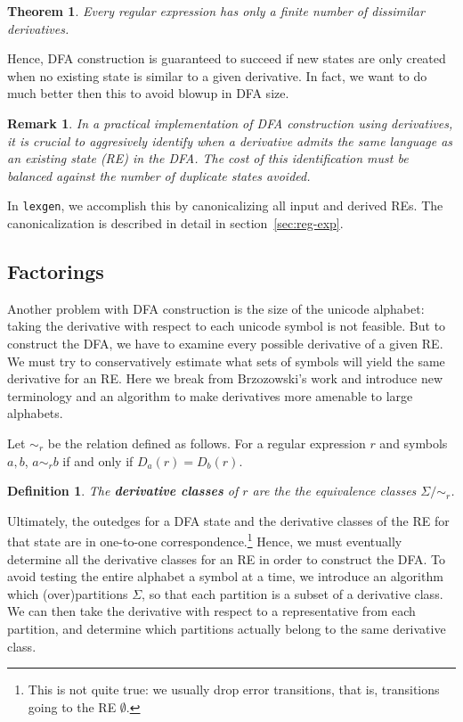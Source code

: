 \documentclass[11pt]{article}
\newcommand{\flex}{\texttt{lexgen}}
\newcommand{\RE}{r}
\newcommand{\New}[1]{\emph{\textbf{#1}}}
\newtheorem*{theorem}{Theorem}
\newtheorem*{definition}{Definition}
\newtheorem*{remark}{Remark}
\begin{document}
\begin{theorem} Every regular expression has only a finite number of dissimilar derivatives.
\end{theorem}

Hence, DFA construction is guaranteed to succeed if new states are only created when no existing state is similar to a given derivative.  In fact, we want to do much better then this to avoid blowup in DFA size.

\begin{remark}
In a practical implementation of DFA construction using derivatives, it is crucial to aggresively identify when a derivative admits the same language as an existing state (RE) in the DFA.  The cost of this identification must be balanced against the number of duplicate states avoided.
\end{remark}

In \flex{}, we accomplish this by canonicalizing all input and derived REs.  The canonicalization is described in detail in section~\ref{sec:reg-exp}.

\subsection{Factorings}\label{sec:factorings}

Another problem with DFA construction is the size of the unicode alphabet: taking the derivative with respect to each unicode symbol is not feasible.  But to construct the DFA, we have to examine every possible derivative of a given RE.  We must try to conservatively estimate what sets of symbols will yield the same derivative for an RE.  Here we break from Brzozowski's work and introduce new terminology and an algorithm to make derivatives more amenable to large alphabets.

Let $\sim_\RE$ be the relation defined as follows.  For a regular expression $\RE$ and symbols $a, b$, $a \sim_\RE b$ if and only if $D_a (\RE) = D_b (\RE)$.

\begin{definition}
The \New{derivative classes} of $\RE$ are the the equivalence classes $\Sigma/{\sim_\RE}$.
\end{definition}

Ultimately, the outedges for a DFA state and the derivative classes of the RE for that state are in one-to-one correspondence.\footnote{This is not quite true: we usually drop error transitions, that is, transitions going to the RE $\emptyset$.}   Hence, we must eventually determine all the derivative classes for an RE in order to construct the DFA.  To avoid testing the entire alphabet a symbol at a time, we introduce an algorithm which (over)partitions $\Sigma$, so that each partition is a subset of a derivative class.   We can then take the derivative with respect to a representative from each partition, and determine which partitions actually belong to the same derivative class.
\end{document}
